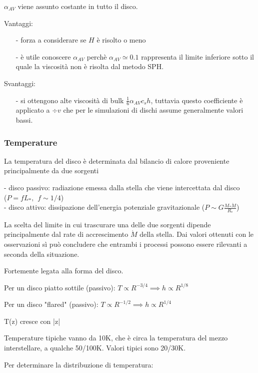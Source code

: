 \documentclass[DIN, pagenumber=false, fontsize=11pt, parskip=half]{scrartcl}
\begin{document}
$\alpha_{AV}$ viene assunto costante in tutto il disco.

Vantaggi:
\begin{enumerate}
 \item[-] forza a considerare se $H$ è risolto o meno
 \item[-] è utile conoscere $\alpha_{AV}$ perchè $\alpha_{AV} \simeq 0.1$ rappresenta il limite inferiore sotto il quale la viscosità non è risolta dal metodo SPH.
\end{enumerate}

Svantaggi:
\begin{enumerate}
 \item[-] si ottengono alte viscosità di bulk $\frac 16 \alpha_{AV} c_s h$, tuttavia questo coefficiente è applicato a $\div v$ che per le simulazioni di dischi assume generalmente valori bassi.
\end{enumerate}


\subsubsection{Temperature}
\label{temp}
La temperatura del disco è determinata dal bilancio di calore proveniente principalmente da due sorgenti

- disco passivo: radiazione emessa dalla stella che viene intercettata dal disco \\($P=fL_*, \hspace{5pt} f\sim 1/4$) \\
- disco attivo: dissipazione dell'energia potenziale gravitazionale ($P \sim 
G \frac{M_*\dot{M}}{R_*}$)

La scelta del limite in cui trascurare una delle due sorgenti dipende principalmente dal rate di accrescimento $\dot{M}$  della stella. Dai valori ottenuti con le osservazioni sì può concludere che entrambi i processi possono essere rilevanti a seconda della situazione.

Fortemente legata alla forma del disco.

Per un disco piatto sottile (passivo): $T \propto R^{-3/4} \implies h \propto R^{1/8}$

Per un disco "flared" (passivo): $T \propto R^{-1/2} \implies h \propto R^{1/4}$ 

T(z) cresce con |z|

Temperature tipiche vanno da 10K, che è circa la temperatura del mezzo interstellare, a qualche 50/100K. Valori tipici sono 20/30K.

Per determinare la distribuzione di temperatura:
\end{document}
